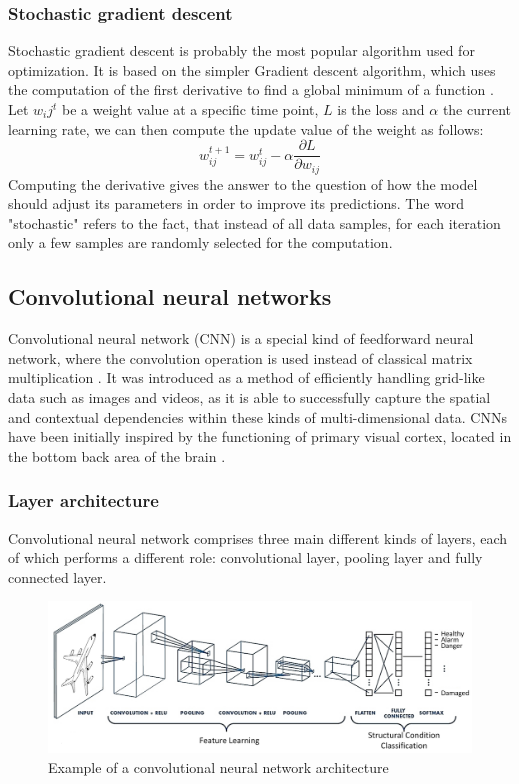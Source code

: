 \subsubsection*{Stochastic gradient descent}
Stochastic gradient descent is probably the most popular algorithm used for optimization. It is based on the simpler Gradient descent algorithm, which uses the computation of the first derivative to find a global minimum of a function \cite{deeplearningbook}. Let $w_ij^t$ be a weight value at a specific time point, $L$ is the loss and $\alpha$ the current learning rate, we can then compute the update value of the weight as follows:
\begin{equation}
w_{ij}^{t+1} = w_{ij}^{t} - \alpha \frac {\partial L}{\partial w_{ij}}   
\end{equation}
Computing the derivative gives the answer to the question of how the model should adjust its parameters in order to improve its predictions. The word "stochastic" refers to the fact, that instead of all data samples, for each iteration only a few samples are randomly selected for the computation.



\subsection{Convolutional neural networks}
Convolutional neural network (CNN) is a special kind of feedforward neural network, where the convolution operation is used instead of classical matrix multiplication \cite{deeplearningbook}. It was introduced as a method of efficiently handling grid-like data such as images and videos, as it is able to successfully capture the spatial and contextual dependencies within these kinds of 
multi-dimensional data. CNNs have been initially inspired by the functioning of primary visual cortex, located in the bottom back area of the brain \cite{deeplearningbook}.
\subsubsection{Layer architecture}
Convolutional neural network comprises three main different kinds of layers, each of which performs a different role: convolutional layer, pooling layer and fully connected layer.
\begin{figure}[!ht]
\centering
\includegraphics[width=15cm]{assets/images/CNN}
\caption[Example of a convolutional neural network architecture]{Example of a convolutional neural network architecture 
\label{fig:CNN}}
\end{figure}


